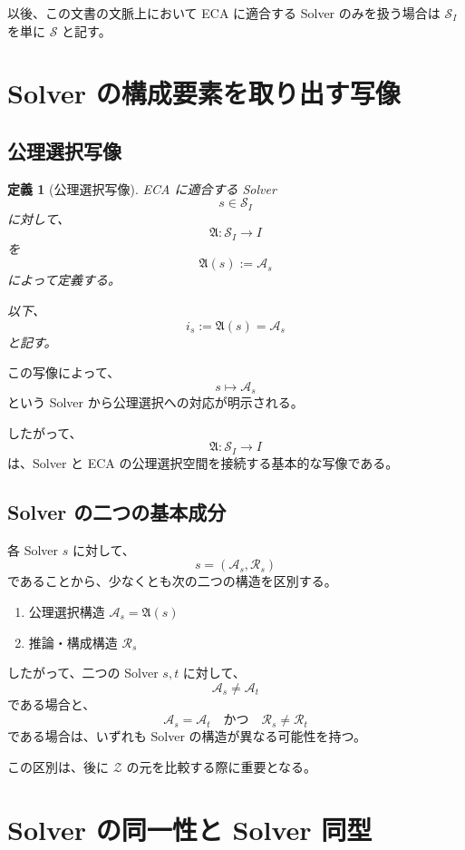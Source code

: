 \documentclass[a4paper,11pt]{article}
\newtheorem{definition}{定義}[section]
\newcommand{\Solver}{\mathcal{S}}
\newcommand{\Sel}{I}
\begin{document}
以後、この文書の文脈上において ECA に適合する Solver のみを扱う場合は $\Solver_{\Sel}$ を単に $\Solver$ と記す。

\section{Solver の構成要素を取り出す写像}

\subsection{公理選択写像}

\begin{definition}[公理選択写像]
ECA に適合する Solver
\[
s\in\Solver_{\Sel}
\]
に対して、
\[
\mathfrak{A}:\Solver_{\Sel}\longrightarrow\Sel
\]
を
\[
\boxed{
\mathfrak{A}(s):=\mathcal{A}_s
}
\]
によって定義する。

以下、
\[
i_s:=\mathfrak{A}(s)=\mathcal{A}_s
\]
と記す。
\end{definition}

この写像によって、
\[
s\longmapsto\mathcal{A}_s
\]
という Solver から公理選択への対応が明示される。

したがって、
\[
\boxed{
\mathfrak{A}:\Solver_{\Sel}\to\Sel
}
\]
は、Solver と ECA の公理選択空間を接続する基本的な写像である。

\subsection{Solver の二つの基本成分}

各 Solver $s$ に対して、
\[
s=(\mathcal{A}_s,\mathcal{R}_s)
\]
であることから、少なくとも次の二つの構造を区別する。

\begin{enumerate}
\item 公理選択構造 $\mathcal{A}_s=\mathfrak{A}(s)$
\item 推論・構成構造 $\mathcal{R}_s$
\end{enumerate}

したがって、二つの Solver $s,t$ に対して、
\[
\mathcal{A}_s\neq\mathcal{A}_t
\]
である場合と、
\[
\mathcal{A}_s=\mathcal{A}_t
\quad\text{かつ}\quad
\mathcal{R}_s\neq\mathcal{R}_t
\]
である場合は、いずれも Solver の構造が異なる可能性を持つ。

この区別は、後に $\mathcal{Z}$ の元を比較する際に重要となる。

\section{Solver の同一性と Solver 同型}
\end{document}
